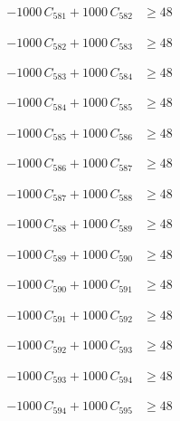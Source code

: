 \documentclass[a4paper,11pt]{article}
\begin{document}
\begin{align}
-1000\,C_{581} + 1000\,C_{582} &\geq 48 \nonumber
\end{align}

\begin{align}
-1000\,C_{582} + 1000\,C_{583} &\geq 48 \nonumber
\end{align}

\begin{align}
-1000\,C_{583} + 1000\,C_{584} &\geq 48 \nonumber
\end{align}

\begin{align}
-1000\,C_{584} + 1000\,C_{585} &\geq 48 \nonumber
\end{align}

\begin{align}
-1000\,C_{585} + 1000\,C_{586} &\geq 48 \nonumber
\end{align}

\begin{align}
-1000\,C_{586} + 1000\,C_{587} &\geq 48 \nonumber
\end{align}

\begin{align}
-1000\,C_{587} + 1000\,C_{588} &\geq 48 \nonumber
\end{align}

\begin{align}
-1000\,C_{588} + 1000\,C_{589} &\geq 48 \nonumber
\end{align}

\begin{align}
-1000\,C_{589} + 1000\,C_{590} &\geq 48 \nonumber
\end{align}

\begin{align}
-1000\,C_{590} + 1000\,C_{591} &\geq 48 \nonumber
\end{align}

\begin{align}
-1000\,C_{591} + 1000\,C_{592} &\geq 48 \nonumber
\end{align}

\begin{align}
-1000\,C_{592} + 1000\,C_{593} &\geq 48 \nonumber
\end{align}

\begin{align}
-1000\,C_{593} + 1000\,C_{594} &\geq 48 \nonumber
\end{align}

\begin{align}
-1000\,C_{594} + 1000\,C_{595} &\geq 48 \nonumber
\end{align}
\end{document}
